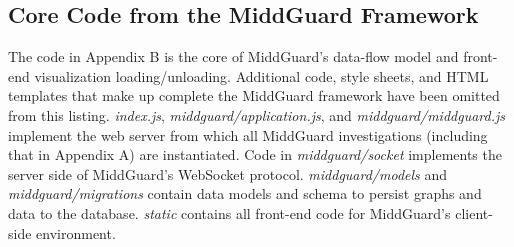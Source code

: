 \documentclass[midd]{thesis}
\begin{document}
\begin{landscape}
  \chapter{Core Code from the MiddGuard Framework}

  \addtolength{\hoffset}{-1cm}
  \addtolength{\textheight}{1cm}

  \begin{multicols}{2}

    The code in Appendix B is the core of MiddGuard's data-flow model and
    front-end visualization loading/unloading. Additional code, style sheets,
    and HTML templates that make up complete the MiddGuard framework have been
    omitted from this listing. \textit{index.js},
    \textit{middguard/application.js}, and \textit{middguard/middguard.js}
    implement the web server from which all MiddGuard investigations (including
    that in Appendix A) are instantiated. Code in \textit{middguard/socket}
    implements the server side of MiddGuard's WebSocket protocol.
    \textit{middguard/models} and \textit{middguard/migrations} contain data
    models and schema to persist graphs and data to the database.
    \textit{static} contains all front-end code for MiddGuard's client-side
    environment.








  \end{multicols}

  \addtolength{\hoffset}{1cm}
  \addtolength{\textheight}{-1cm}
\end{landscape}


\end{document}
